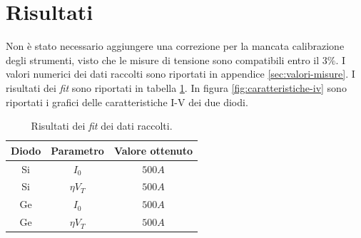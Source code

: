 \documentclass[11pt, a4paper, twoside]{article}
\begin{document}
\section{Risultati}\label{sec:risultati}
  Non è stato necessario aggiungere una correzione per la mancata calibrazione degli strumenti, visto che le misure di
  tensione sono compatibili entro il $3\%$. %
  I valori numerici dei dati raccolti sono riportati in appendice \ref{sec:valori-misure}.
  I risultati dei \emph{fit} sono riportati in tabella \ref{tab:risultati-fit}.
  In figura \ref{fig:caratteristiche-iv} sono riportati i grafici delle caratteristiche I-V dei due diodi.
  \begin{table}[H]
    \centering
    \begin{tabular}[t]{ccc}
      \toprule
      Diodo& Parametro &Valore ottenuto\\
      \midrule
      Si & $I_0$ &  $500A$ \\
      Si & $\eta V_T$ &  $500A$ \\
      Ge & $I_0$ &  $500A$ \\
      Ge & $\eta V_T$ &  $500A$ \\
      \bottomrule
      \end{tabular}
    \caption{
      Risultati dei \emph{fit} dei dati raccolti.
    }
    \label{tab:risultati-fit}
  \end{table}
\end{document}
